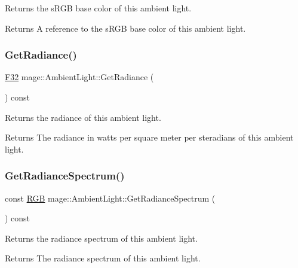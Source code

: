 Returns the s\+R\+GB base color of this ambient light.

\begin{DoxyReturn}{Returns}
A reference to the s\+R\+GB base color of this ambient light. 
\end{DoxyReturn}
\hypertarget{classmage_1_1_ambient_light_ab41f72d902f590ebc62ab58427e2bdab}{}\label{classmage_1_1_ambient_light_ab41f72d902f590ebc62ab58427e2bdab} 
\subsubsection{\texorpdfstring{Get\+Radiance()}{GetRadiance()}}
{\footnotesize\ttfamily \hyperlink{namespacemage_aa97e833b45f06d60a0a9c4fc22ae02c0}{F32} mage\+::\+Ambient\+Light\+::\+Get\+Radiance (\begin{DoxyParamCaption}{ }\end{DoxyParamCaption}) const\hspace{0.3cm}{\ttfamily [noexcept]}}

Returns the radiance of this ambient light.

\begin{DoxyReturn}{Returns}
The radiance in watts per square meter per steradians of this ambient light. 
\end{DoxyReturn}
\hypertarget{classmage_1_1_ambient_light_a5d135eeeef619f13435341eebd3fe476}{}\label{classmage_1_1_ambient_light_a5d135eeeef619f13435341eebd3fe476} 
\subsubsection{\texorpdfstring{Get\+Radiance\+Spectrum()}{GetRadianceSpectrum()}}
{\footnotesize\ttfamily const \hyperlink{structmage_1_1_r_g_b}{R\+GB} mage\+::\+Ambient\+Light\+::\+Get\+Radiance\+Spectrum (\begin{DoxyParamCaption}{ }\end{DoxyParamCaption}) const\hspace{0.3cm}{\ttfamily [noexcept]}}

Returns the radiance spectrum of this ambient light.

\begin{DoxyReturn}{Returns}
The radiance spectrum of this ambient light. 
\end{DoxyReturn}
\hypertarget{classmage_1_1_ambient_light_aa6f399dfc958a0073d93f98f0e8f0069}{}\label{classmage_1_1_ambient_light_aa6f399dfc958a0073d93f98f0e8f0069} 
